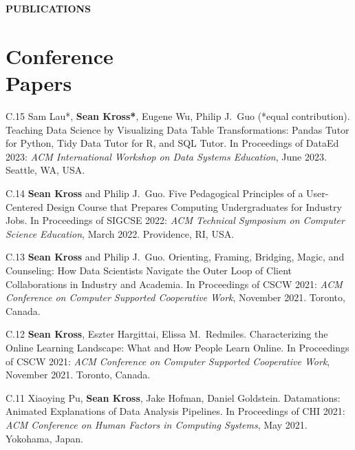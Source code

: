 \section{} \vspace{0.2in} \textbf{PUBLICATIONS} \vspace{-0.05in}


\section{Conference \\ Papers}

\begin{bibenum}

\item[C.15] Sam Lau*, \textbf{Sean Kross*}, Eugene Wu, Philip J.\ Guo  (*equal contribution). 
Teaching Data Science by Visualizing Data Table Transformations: Pandas Tutor for Python, Tidy Data Tutor for R, and SQL Tutor.
In Proceedings of DataEd 2023: \emph{ACM International Workshop on Data Systems Education}, June 2023. Seattle, WA, USA.

\item[C.14] \textbf{Sean Kross} and Philip J.\ Guo. 
Five Pedagogical Principles of a User-Centered Design Course that Prepares Computing Undergraduates for Industry Jobs.
In Proceedings of SIGCSE 2022: \emph{ACM Technical Symposium on Computer Science Education}, March 2022. Providence, RI, USA.

\item[C.13] \textbf{Sean Kross} and Philip J.\ Guo. 
Orienting, Framing, Bridging, Magic, and Counseling: How Data Scientists Navigate the Outer Loop of Client Collaborations in Industry and Academia.
In Proceedings of CSCW 2021: \emph{ACM Conference on Computer Supported Cooperative Work}, November 2021. Toronto, Canada.

\item[C.12] \textbf{Sean Kross}, Eszter Hargittai, Elissa M.\ Redmiles. 
Characterizing the Online Learning Landscape: What and How People Learn Online.
In Proceedings of CSCW 2021: \emph{ACM Conference on Computer Supported Cooperative Work}, November 2021. Toronto, Canada.

\item[C.11] Xiaoying Pu, \textbf{Sean Kross}, Jake Hofman, Daniel Goldstein. 
Datamations: Animated Explanations of Data Analysis Pipelines.
In Proceedings of CHI 2021: \emph{ACM Conference on Human Factors in Computing 
Systems}, May 2021. Yokohama, Japan.


\end{bibenum}
